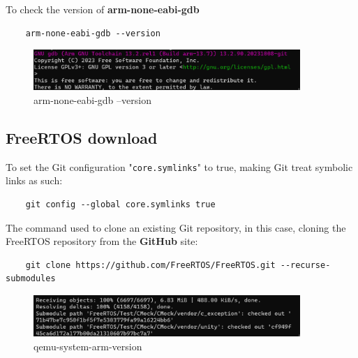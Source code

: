 \documentclass{exam}
\begin{document}
To check the version of \textbf{arm-none-eabi-gdb}
\begin{lstlisting}
    arm-none-eabi-gdb --version 
\end{lstlisting}
\begin{figure}[h]
    \centering
    \includegraphics[width=0.90\textwidth]{graphics/arm-none-eabi-gdb-version.png}
    \caption{arm-none-eabi-gdb --version}
    \label{fig:riferimentoNelTestoNelCasoVogliaCitareLimmagine}
\end{figure}
\subsection{FreeRTOS download}
To set the Git configuration "\texttt{core.symlinks}" to true, making Git treat symbolic links as such:
\begin{lstlisting}
    git config --global core.symlinks true 
\end{lstlisting}
The command used to clone an existing Git repository, in this case, cloning the FreeRTOS repository from the \textbf{GitHub} site:
\begin{lstlisting}
    git clone https://github.com/FreeRTOS/FreeRTOS.git --recurse-submodules
\end{lstlisting}
\begin{figure}[h]
    \centering
    \includegraphics[width=0.90\textwidth]{graphics/git-clone-freertos.png}
    \caption{qemu-system-arm-version}
    \label{fig:riferimentoNelTestoNelCasoVogliaCitareLimmagine}
\end{figure}
\end{document}
